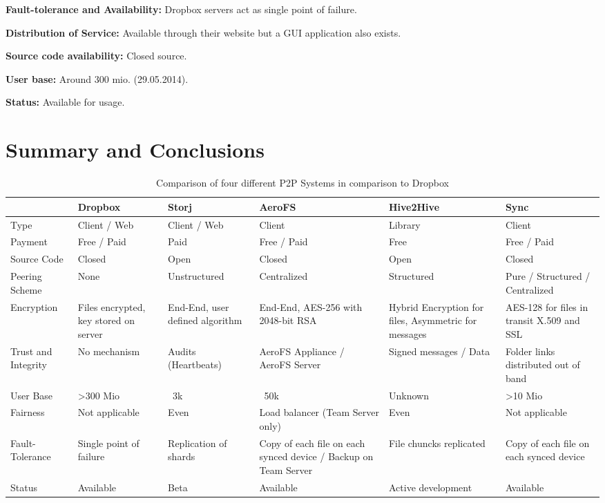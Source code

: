 \textbf{Fault-tolerance and Availability:} Dropbox servers act as single point of failure.

\textbf{Distribution of Service:} Available through their website but a GUI application also exists.

\textbf{Source code availability:} Closed source.

\textbf{User base:} Around 300 mio. (29.05.2014)\cite{dropbox:userbase}.

\textbf{Status:} Available for usage.

\section{Summary and Conclusions}
\begin{table}
	\centering
	\caption{Comparison of four different P2P Systems in comparison to Dropbox}
		\begin{tabular}{ | *{6}{ p{2.5cm} |} }
			\hline
			& Dropbox & Storj & AeroFS & Hive2Hive & Sync \\ \hline
			Type & Client / Web & Client / Web & Client & Library & Client \\ \hline
			Payment & Free / Paid & Paid & Free / Paid & Free & Free / Paid \\ \hline
			Source Code & Closed & Open & Closed & Open & Closed \\ \hline
			Peering Scheme & None & Unstructured & Centralized & Structured & Pure / Structured / Centralized \\ \hline
			Encryption & Files encrypted, key stored on server & End-End, user defined algorithm & End-End, AES-256 with 2048-bit RSA & Hybrid Encryption for files, Asymmetric for messages & AES-128 for files in transit X.509 and SSL \\ \hline
			Trust and Integrity & No mechanism & Audits (Heartbeats) & AeroFS Appliance / AeroFS Server & Signed messages / Data & Folder links distributed out of band \\ \hline
			User Base & >300 Mio & ~3k & ~50k & Unknown & >10 Mio \\ \hline
			Fairness & Not applicable & Even & Load balancer (Team Server only) & Even & Not applicable \\ \hline
			Fault-Tolerance & Single point of failure & Replication of shards & Copy of each file on each synced device / Backup on Team Server & File chuncks replicated & Copy of each file on each synced device \\ \hline
			Status & Available & Beta & Available & Active development & Available \\ \hline
		\end{tabular}
\end{table}

